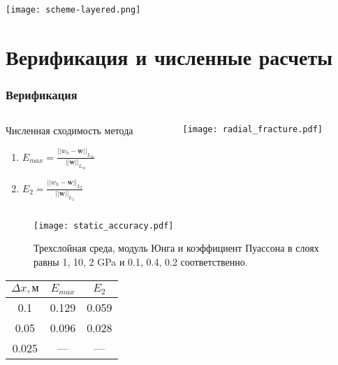 \begin{frame}
    \centering
    \texttt{[image: scheme-layered.png]}
\end{frame}


\section{Верификация и численные расчеты}

\begin{frame}[t]
    \frametitle{Верификация}
    \begin{columns}
        \begin{column}{0.4\textwidth}
            Численная сходимость метода
            \begin{enumerate}
                \item $E_{max} = \frac{||w_h - \mathbf{w}||_{L_\infty}}{||\mathbf{w}||_{L_\infty}}$
                \item $E_2 = \frac{||w_h - \mathbf{w}||_{L_2}}{||\mathbf{w}||_{L_2}}$
            \end{enumerate}
        \end{column}
        \begin{column}{0.55\textwidth}
            \centering
            \texttt{[image: radial\_fracture.pdf]}
        \end{column}
    \end{columns}
\end{frame}

\begin{frame}
    \centering
    \begin{figure}
        \texttt{[image: static\_accuracy.pdf]}
        \caption{\footnotesize{Трехслойная среда, модуль Юнга и коэффициент Пуассона в слоях равны 1, 10, 2 GPa и 0.1, 0.4, 0.2 соответственно.}}
    \end{figure}

    \begin{tabular}{|c|c|c|}
        \hline
        $\Delta x, \text{м}$ & $E_{max}$ & $E_2$ \\
        \hline
        0.1                     & 0.129     & 0.059 \\
        \hline
        0.05                    & 0.096     & 0.028 \\
        \hline
        0.025 & --- & --- \\
        \hline
    \end{tabular}
\end{frame}

